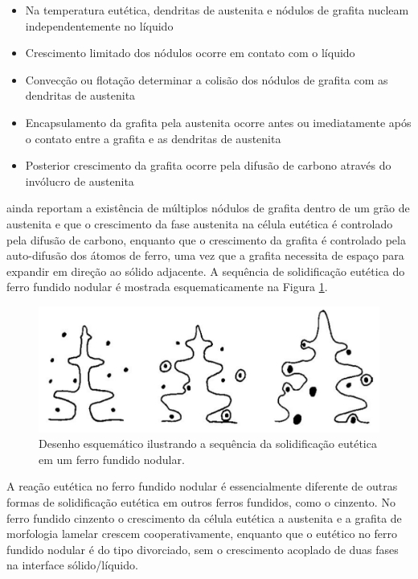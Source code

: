 \begin{itemize}
  \item Na temperatura eutética, dendritas de austenita e nódulos de grafita nucleam independentemente no líquido
  \item Crescimento limitado dos nódulos ocorre em contato com o líquido
  \item Convecção ou flotação determinar a colisão dos nódulos de grafita com as dendritas de austenita
  \item Encapsulamento da grafita pela austenita ocorre antes ou imediatamente após o contato entre a grafita e as dendritas de austenita
  \item Posterior crescimento da grafita ocorre pela difusão de carbono através do invólucro de austenita
\end{itemize}

 ainda reportam a existência de múltiplos nódulos de grafita dentro de um grão de austenita e que o crescimento da fase austenita na célula eutética é controlado pela difusão de carbono, enquanto que o crescimento da grafita é controlado pela auto-difusão dos átomos de ferro, uma vez que a grafita necessita de espaço para expandir em direção ao sólido adjacente. A sequência de solidificação eutética do ferro fundido nodular é mostrada esquematicamente na Figura \ref{fig:eutetico_nodular}.

\begin{figure}
  \includegraphics[width=.7\textwidth]{img/eutetico_nodular.pdf}
  \caption{Desenho esquemático ilustrando a sequência da solidificação eutética em um ferro fundido nodular\cite{Polackzek2008}.}
  \label{fig:eutetico_nodular}
\end{figure}

A reação eutética no ferro fundido nodular é essencialmente diferente de outras formas de solidificação eutética em outros ferros fundidos, como o cinzento. No ferro fundido cinzento o crescimento da célula eutética a austenita e a grafita de morfologia lamelar crescem cooperativamente, enquanto que o eutético no ferro fundido nodular é do tipo divorciado, sem o crescimento acoplado de duas fases na interface sólido/líquido\cite{Santos1989,Polackzek2008}.

